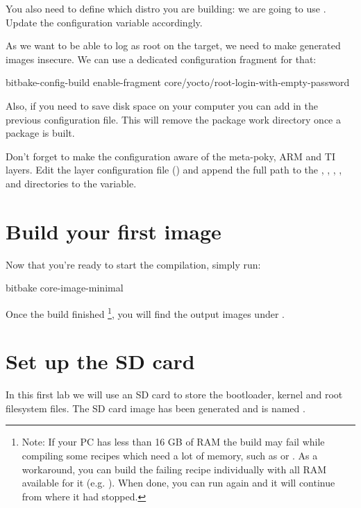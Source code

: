 You also need to define which distro you are building: we are going to use
.
Update the  configuration variable accordingly.

As we want to be able to log as root on the target, we need to make generated
images insecure. We can use a dedicated configuration fragment for that:
\begin{bashinput}
bitbake-config-build enable-fragment core/yocto/root-login-with-empty-password
\end{bashinput}

Also, if you need to save disk space on your computer you can add  in the previous configuration file. This will remove the
package work directory once a package is built.

Don't forget to make the configuration aware of the meta-poky, ARM and TI
layers.
Edit the layer configuration file () and
append the full path to the
,
,
,
,
and 
directories to the  variable.

\section{Build your first image}

Now that you're ready to start the compilation, simply run:
\begin{bashinput}
bitbake core-image-minimal
\end{bashinput}

Once the build finished%
%
\footnote{Note: If your PC has less than 16 GB of
RAM the build may fail while compiling some recipes which need a lot of
memory, such as  or . As a
workaround, you can build the failing recipe individually with all RAM
available for it (e.g. ). When done, you can
run  again and it will continue from where
it had stopped.},
%
you will find the output images under
.

\section{Set up the SD card}

In this first lab we will use an SD card to store the bootloader, kernel and
root filesystem files. The SD card image has been generated and is
named .

